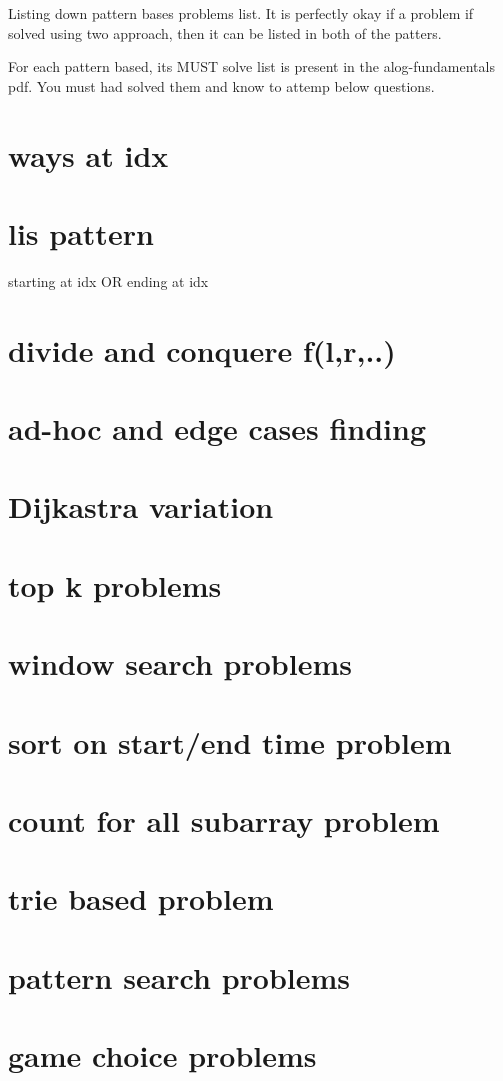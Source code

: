 
Listing down pattern bases problems list.
It is perfectly okay if a problem if solved using two approach, then it can be listed in both of the patters.

For each pattern based, its MUST solve list is present in the alog-fundamentals pdf. You must had solved them and know to attemp below questions.

\setcounter{chapter}{0}
\chapter{ways at idx}
\chapter{lis pattern}
starting at idx OR ending at idx
\chapter{divide and conquere f(l,r,..)}
\chapter{ad-hoc and edge cases finding}
\chapter{Dijkastra variation}
\chapter{top k problems}
\chapter{window search problems}
\chapter{sort on start/end time problem}
\chapter{count for all subarray problem}
\chapter{trie based problem}
\chapter{pattern search problems}
\chapter{game choice problems}

